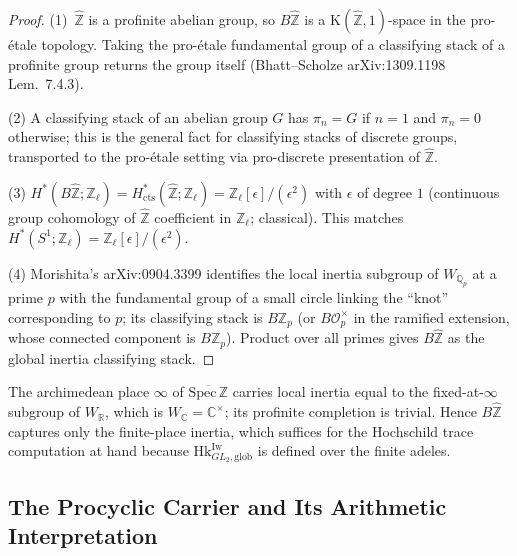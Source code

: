 \begin{proof}
(1)~\(\widehat{\mathbb{Z}}\) is a profinite abelian group, so
\(B\widehat{\mathbb{Z}}\) is a \(\mathrm{K}(\widehat{\mathbb{Z}},1)\)-space
in the pro-\'etale topology. Taking the pro-\'etale fundamental
group of a classifying stack of a profinite group returns the group
itself (Bhatt--Scholze arXiv:1309.1198 Lem.~7.4.3).

(2) A classifying stack of an abelian group \(G\) has \(\pi_{n}=G\)
if \(n=1\) and \(\pi_{n}=0\) otherwise; this is the general fact for
classifying stacks of discrete groups, transported to the
pro-\'etale setting via pro-discrete presentation of
\(\widehat{\mathbb{Z}}\).

(3) \(H^{*}(B\widehat{\mathbb{Z}};\mathbb{Z}_{\ell})=H^{*}_{\mathrm{cts}}(\widehat{\mathbb{Z}};\mathbb{Z}_{\ell})=\mathbb{Z}_{\ell}[\epsilon]/(\epsilon^{2})\)
with \(\epsilon\) of degree \(1\) (continuous group cohomology of
\(\widehat{\mathbb{Z}}\) coefficient in \(\mathbb{Z}_{\ell}\); classical).
This matches \(H^{*}(S^{1};\mathbb{Z}_{\ell})=\mathbb{Z}_{\ell}[\epsilon]/(\epsilon^{2})\).

(4) Morishita's arXiv:0904.3399 identifies the local inertia
subgroup of \(W_{\mathbb{Q}_{p}}\) at a prime \(p\) with the
fundamental group of a small circle linking the ``knot''
corresponding to \(p\); its classifying stack is \(B\mathbb{Z}_{p}\)
(or \(B\mathcal{O}_{p}^{\times}\) in the ramified extension, whose
connected component is \(B\mathbb{Z}_{p}\)). Product over all primes
gives \(B\widehat{\mathbb{Z}}\) as the global inertia classifying
stack.
\end{proof}

\begin{remark}
\label{v4-arith:bzn:rem:archimedean}
The archimedean place \(\infty\) of \(\overline{\mathrm{Spec}\,\mathbb{Z}}\)
carries local inertia equal to the fixed-at-\(\infty\) subgroup of
\(W_{\mathbb{R}}\), which is \(W_{\mathbb{C}}=\mathbb{C}^{\times}\);
its profinite completion is trivial. Hence \(B\widehat{\mathbb{Z}}\)
captures only the finite-place inertia, which suffices for the
Hochschild trace computation at hand because \(\mathrm{Hk}^{\mathrm{Iw}}_{GL_{2},\mathrm{glob}}\)
is defined over the finite adeles.
\end{remark}

\subsection{The Procyclic Carrier and Its Arithmetic Interpretation}

